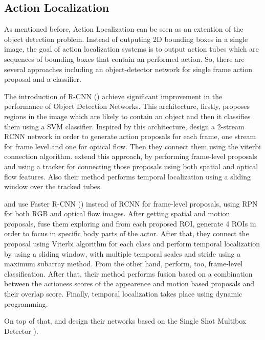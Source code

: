\subsection{Action Localization}

As mentioned before, Action Localization can be seen as an extention of the object detection problem. Instead of outputing 2D bounding
boxes in a single image, the goal of action localization systems is to output action tubes which are sequences of bounding boxes that
contain an performed action. So, there are several approaches including an object-detector network for single frame
action proposal and a classifier. \par
The introduction of R-CNN (\cite{DBLP:journals/corr/GirshickDDM13}) achieve significant improvement
in the performance of Object Detection Networks. This architecture, firstly, proposes regions in the image which are likely to
contain an object and then it classifies them using a SVM classifier. Inspired by this architecture, \cite{DBLP:journals/corr/GkioxariM14}
design a 2-stream RCNN network in order to generate action proposals for each frame, one stream for frame level and one for optical flow.
Then they  connect them using the viterbi connection algorithm. \cite{DBLP:journals/corr/WeinzaepfelHS15} extend this approach, by performing
frame-level proposals and using a tracker for connecting those proposals using both spatial and optical flow features. Also their method performs
temporal localization using a sliding window over the tracked tubes. \par
\cite{peng:hal-01349107} and \cite{DBLP:journals/corr/SahaSSTC16} use Faster R-CNN (\cite{Ren:2015:FRT:2969239.2969250}) instead of RCNN
for frame-level proposals, using RPN for both RGB and optical flow images.
After getting spatial and motion proposals,\cite{peng:hal-01349107} fuse them exploring and from each proposed ROI, generate 4 ROIs in order to focus in specific
body parts of the actor. After that, they connect the proposal using Viterbi algorithm for each class and perform temporal localization by using a sliding window, with multiple
temporal scales and stride using a maximum subarray method. From the other hand, \cite{DBLP:journals/corr/SahaSSTC16} perform, too, frame-level classification. After that,
their method performs fusion based on a combination between the actioness scores of the appearence and motion based proposals and their overlap score. Finally, temporal localization
takes place using dynamic programming. \par
On top of that, \cite{singh2016online} and \cite{kalogeiton17iccv:hal-01519812} design their networks based on the Single Shot Multibox Detector \cite{DBLP:journals/corr/LiuAESR15}).
